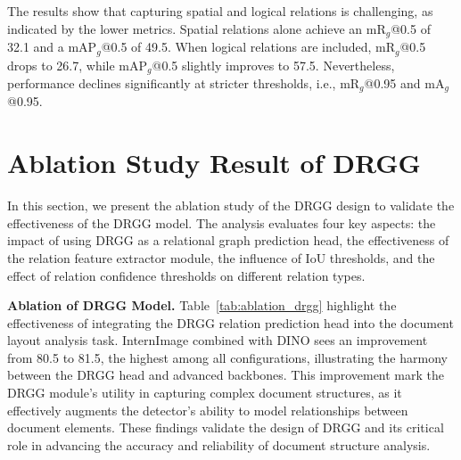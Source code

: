 \begin{table}[ht]
\centering
\caption{{Results for relation prediction performance under different relation types.}}
\renewcommand{\arraystretch}{1.2}
\label{tab:spatial_logical_results}
\end{table}

{The results show that capturing spatial and logical relations is challenging, as indicated by the lower metrics. Spatial relations alone achieve an mR$_g$@0.5 of 32.1 and a mAP$_g$@0.5 of 49.5. When logical relations are included, mR$_g$@0.5 drops to 26.7, while mAP$_g$@0.5 slightly improves to 57.5. Nevertheless, performance declines significantly at stricter thresholds, i.e., mR$_g$@0.95 and mA$_g$@0.95.}


\section{Ablation Study Result of DRGG}
\label{ablation}
In this section, we present {the} ablation study of the DRGG design to validate the effectiveness of the DRGG model. {The analysis evaluates four key aspects: the impact of using DRGG as a relational graph prediction head, the effectiveness of the relation feature extractor module, the influence of IoU thresholds, and the effect of relation confidence thresholds on different relation types.}

\noindent \textbf{Ablation of DRGG Model.} Table~\ref{tab:ablation_drgg} {highlight the effectiveness of integrating the DRGG relation prediction head into the document layout analysis task. InternImage combined with DINO sees an improvement from 80.5 to 81.5, the highest among all configurations, illustrating the harmony between the DRGG head and advanced backbones. This improvement mark the DRGG module's utility in capturing complex document structures, as it effectively augments the detector's ability to model relationships between document elements. These findings validate the design of DRGG and its critical role in advancing the accuracy and reliability of document structure analysis.}


